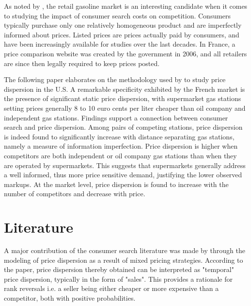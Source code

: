 \documentclass[english]{article}
\begin{document}
As noted by \cite{TAP11}, the retail gasoline market is an interesting candidate when it comes to studying the impact of consumer search costs on competition. Consumers typically purchase only one relatively homogeneous product and are imperfectly informed about prices. Listed prices are prices actually paid by consumers, and have been increasingly available for studies over the last decades. In France, a price comparison website was created by the government in 2006, and all retailers are since then legally required to keep prices posted.

The following paper elaborates on the methodology used by \cite{TAP11} to study price dispersion in the U.S. A remarkable specificity exhibited by the French market is the presence of significant static price dispersion, with supermarket gas stations setting prices generally 8 to 10 euro cents per liter cheaper than oil company and independent gas stations. Findings support a connection between consumer search and price dispersion. Among pairs of competing stations, price dispersion is indeed found to significantly increase with distance separating gas stations, namely a measure of information imperfection. Price dispersion is higher when competitors are both independent or oil company gas stations than when they are operated by supermarkets. This suggests that supermarkets generally address a well informed, thus more price sensitive demand, justifying the lower observed markups. At the market level, price dispersion is found to increase with the number of competitors and decrease with price.

\section{Literature}

A major contribution of the consumer search literature was made by \cite{VAR80} through the modeling of price dispersion as a result of mixed pricing strategies. According to the paper, price dispersion thereby obtained can be interpreted as "temporal" price dispersion, typically in the form of "sales". This provides a rationale for rank reversals i.e. a seller being either cheaper or more expensive than a competitor, both with positive probabilities.
\end{document}
